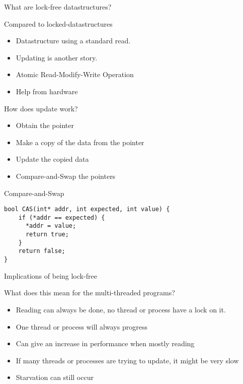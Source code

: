 \begin{frame}{What are lock-free datastructures?}
	\begin{block}{Compared to locked-datastructures}
		\begin{itemize}
			\item Datastructure using a standard \textcolor{ReneOrange}{read}.
			\item \textcolor{ReneOrange}{Updating} is another story.
			\item Atomic \textcolor{ReneOrange}{Read-Modify-Write} Operation
			\item Help from hardware
		\end{itemize}
	\end{block}
	\begin{block}{How does update work?}
		\begin{itemize}
			\item Obtain the pointer
			\item Make a copy of the data from the pointer
			\item Update the copied data
			\item \textcolor{ReneOrange}{Compare-and-Swap} the pointers
		\end{itemize}
	\end{block}

\begin{block}{Compare-and-Swap}
\begin{lstlisting}[style=customc]
bool CAS(int* addr, int expected, int value) {
	if (*addr == expected) {
	  *addr = value;
	  return true;
	}
	return false;
} 
\end{lstlisting}
\end{block}
\end{frame}

\begin{frame}{Implications of being lock-free}
	\begin{block}{What does this mean for the multi-threaded programs?}
		\begin{itemize}
			\item Reading can always be done, no thread or process have a \textcolor{ReneOrange}{lock} on it.
			\item One thread or process will always progress
			\item Can give an increase in performance when mostly reading
			\item If many threads or processes are trying to update, it might be very slow
			\item \textcolor{ReneOrange}{Starvation} can still occur
		\end{itemize}
	\end{block}
\end{frame}